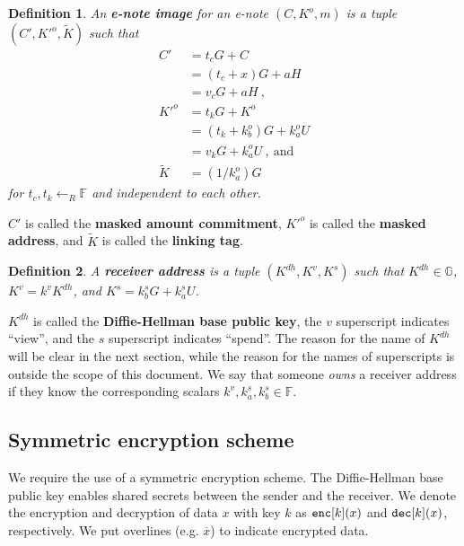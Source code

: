 \documentclass{article}
\newtheorem{definition}{Definition}[section]
\begin{document}
\begin{definition}\label{e-note-img}
An \textbf{\em e-note image} for an e-note $(C, K^o, m)$ is a tuple $(C', K'^o, \tilde{K})$ such that
\begin{align*}
C' &= t_c G + C \\ &= (t_c+x)G + aH \\ &= v_c G + aH \ , \\
K'^o &= t_k G + K^o \\ &= (t_k + k_b^o) G + k_a^o U \\ &= v_k G + k_a^o U \ ,\ \text{and} \\
\tilde{K} &= (1/k_a^o)G
\end{align*}
for $t_c, t_k \leftarrow_R\mathbb{F}$ and independent to each other.
\end{definition}
$C'$ is called the \textbf{masked amount commitment}, $K'^o$ is called the \textbf{masked address}, and $\tilde{K}$ is called the \textbf{linking tag}.

\begin{definition}\label{recv-addr}
A \textbf{\em receiver address} is a tuple $(K^{dh}, K^v, K^s)$  such that $K^{dh}\in\mathbb{G}$, $K^v = k^v K^{dh}$, and $K^s = k_b^s G + k_a^s U$.
\end{definition}
$K^{dh}$ is called the \textbf{Diffie-Hellman base public key}, the $v$ superscript indicates ``view'', and the $s$ superscript indicates ``spend''. The reason for the name of $K^{dh}$ will be clear in the next section, while the reason for the names of superscripts is outside the scope of this document. We say that someone \textit{owns} a receiver address if they know the corresponding scalars $k^v, k_a^s, k_b^s \in\mathbb{F}$.

\subsection{Symmetric encryption scheme}
We require the use of a symmetric encryption scheme. The Diffie-Hellman base public key enables shared secrets between the sender and the receiver. We denote the encryption and decryption of data $x$ with key $k$ as ${\tt enc}[k](x)$ and ${\tt dec}[k](x)$, respectively. We put overlines (e.g. $\overline{x}$) to indicate encrypted data.
\end{document}
